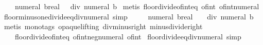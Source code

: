 \begin{isabellebody}
\ \ {\isachardoublequoteopen}{\isasymlfloor}{}\ {\isacharslash}{\kern0pt}\ numeral\ b{\isacharcolon}{\kern0pt}{\isacharcolon}{\kern0pt}real{\isasymrfloor}\ {\isacharequal}{\kern0pt}\ {}\ div\ numeral\ b{\isachardoublequoteclose}\isanewline
%
\isadelimproof
%
\endisadelimproof
%
\isatagproof
{}\isamarkupfalse%
\ {\isacharparenleft}{\kern0pt}metis\ floor{\isacharunderscore}{\kern0pt}divide{\isacharunderscore}{\kern0pt}of{\isacharunderscore}{\kern0pt}int{\isacharunderscore}{\kern0pt}eq\ of{\isacharunderscore}{\kern0pt}int{\isacharunderscore}{\kern0pt}{}\ of{\isacharunderscore}{\kern0pt}int{\isacharunderscore}{\kern0pt}numeral{\isacharparenright}{\kern0pt}%
\endisatagproof
{\isafoldproof}%
%
\isadelimproof
\isanewline
%
\endisadelimproof
\isanewline
{}\isamarkupfalse%
\ floor{\isacharunderscore}{\kern0pt}minus{\isacharunderscore}{\kern0pt}one{\isacharunderscore}{\kern0pt}divide{\isacharunderscore}{\kern0pt}eq{\isacharunderscore}{\kern0pt}div{\isacharunderscore}{\kern0pt}numeral\ {\isacharbrackleft}{\kern0pt}simp{\isacharbrackright}{\kern0pt}{\isacharcolon}{\kern0pt}\isanewline
\ \ {\isachardoublequoteopen}{\isasymlfloor}{\isacharminus}{\kern0pt}\ {\isacharparenleft}{\kern0pt}{}\ {\isacharslash}{\kern0pt}\ numeral\ b{\isacharparenright}{\kern0pt}{\isacharcolon}{\kern0pt}{\isacharcolon}{\kern0pt}real{\isasymrfloor}\ {\isacharequal}{\kern0pt}\ {\isacharminus}{\kern0pt}\ {}\ div\ numeral\ b{\isachardoublequoteclose}\isanewline
%
\isadelimproof
%
\endisadelimproof
%
\isatagproof
{}\isamarkupfalse%
\ {\isacharparenleft}{\kern0pt}metis\ {\isacharparenleft}{\kern0pt}mono{\isacharunderscore}{\kern0pt}tags{\isacharcomma}{\kern0pt}\ opaque{\isacharunderscore}{\kern0pt}lifting{\isacharparenright}{\kern0pt}\ div{\isacharunderscore}{\kern0pt}minus{\isacharunderscore}{\kern0pt}right\ minus{\isacharunderscore}{\kern0pt}divide{\isacharunderscore}{\kern0pt}right\isanewline
\ \ \ \ floor{\isacharunderscore}{\kern0pt}divide{\isacharunderscore}{\kern0pt}of{\isacharunderscore}{\kern0pt}int{\isacharunderscore}{\kern0pt}eq\ of{\isacharunderscore}{\kern0pt}int{\isacharunderscore}{\kern0pt}neg{\isacharunderscore}{\kern0pt}numeral\ of{\isacharunderscore}{\kern0pt}int{\isacharunderscore}{\kern0pt}{}{\isacharparenright}{\kern0pt}%
\endisatagproof
{\isafoldproof}%
%
\isadelimproof
\isanewline
%
\endisadelimproof
\isanewline
{}\isamarkupfalse%
\ floor{\isacharunderscore}{\kern0pt}divide{\isacharunderscore}{\kern0pt}eq{\isacharunderscore}{\kern0pt}div{\isacharunderscore}{\kern0pt}numeral\ {\isacharbrackleft}{\kern0pt}simp{\isacharbrackright}{\kern0pt}{\isacharcolon}{\kern0pt}\isanewline

\end{isabellebody}
